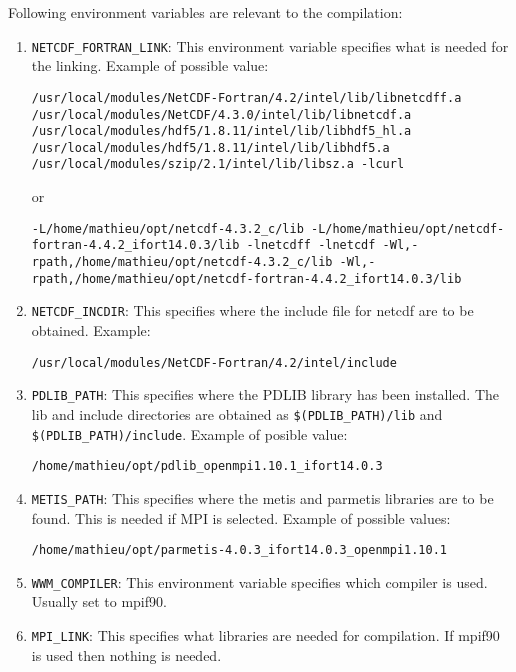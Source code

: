 \documentclass[12pt]{amsart}
\begin{document}
Following environment variables are relevant to the compilation:
\begin{enumerate}
\item {\tt NETCDF\_FORTRAN\_LINK}: This environment variable specifies what is needed for the linking. Example of possible value:
\begin{flushleft}
{\tt /usr/local/modules/NetCDF-Fortran/4.2/intel/lib/libnetcdff.a /usr/local/modules/NetCDF/4.3.0/intel/lib/libnetcdf.a /usr/local/modules/hdf5/1.8.11/intel/lib/libhdf5\_hl.a /usr/local/modules/hdf5/1.8.11/intel/lib/libhdf5.a /usr/local/modules/szip/2.1/intel/lib/libsz.a -lcurl}
\end{flushleft}
or
\begin{flushleft}
{\tt -L/home/mathieu/opt/netcdf-4.3.2\_c/lib -L/home/mathieu/opt/netcdf-fortran-4.4.2\_ifort14.0.3/lib -lnetcdff -lnetcdf -Wl,-rpath,/home/mathieu/opt/netcdf-4.3.2\_c/lib -Wl,-rpath,/home/mathieu/opt/netcdf-fortran-4.4.2\_ifort14.0.3/lib}
\end{flushleft}

\item {\tt NETCDF\_INCDIR}: This specifies where the include file for netcdf are to be obtained. Example:
\begin{verbatim}
/usr/local/modules/NetCDF-Fortran/4.2/intel/include
\end{verbatim}

\item {\tt PDLIB\_PATH}: This specifies where the PDLIB library has been installed. The lib and include directories are obtained as {\tt \$(PDLIB\_PATH)/lib} and {\tt \$(PDLIB\_PATH)/include}. Example of posible value:
\begin{verbatim}
/home/mathieu/opt/pdlib_openmpi1.10.1_ifort14.0.3
\end{verbatim}

\item {\tt METIS\_PATH}: This specifies where the metis and parmetis libraries are to be found. This is needed if MPI is selected. Example of possible values:
\begin{verbatim}
/home/mathieu/opt/parmetis-4.0.3_ifort14.0.3_openmpi1.10.1
\end{verbatim}

\item {\tt WWM\_COMPILER}: This environment variable specifies which compiler is used. Usually set to mpif90.
  
\item {\tt MPI\_LINK}: This specifies what libraries are needed for compilation. If mpif90 is used then nothing is needed.


\end{enumerate}
\end{document}
